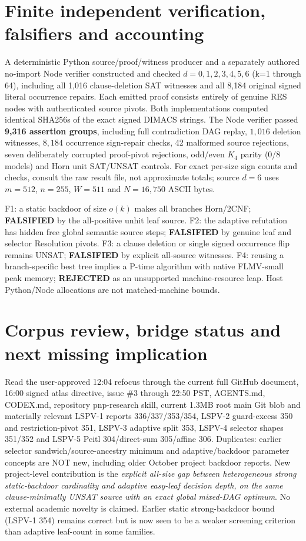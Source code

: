 \documentclass[11pt]{article}
\begin{document}
\section*{Finite independent verification, falsifiers and accounting}
A deterministic Python source/proof/witness producer and a separately authored no-import Node verifier constructed and checked \(d=0,1,2,3,4,5,6\) (k=1 through 64), including all 1,016 clause-deletion SAT witnesses and all 8,184 original signed literal occurrence repairs. Each emitted proof consists entirely of genuine RES nodes with authenticated source pivots. Both implementations computed identical SHA256s of the exact signed DIMACS strings. The Node verifier passed \textbf{9,316 assertion groups}, including full contradiction DAG replay, \(1,016\) deletion witnesses, \(8,184\) occurrence sign-repair checks, 42 malformed source rejections, seven deliberately corrupted proof-pivot rejections, odd/even \(K_4\) parity (0/8 models) and Horn unit SAT/UNSAT controls. For exact per-size sign counts and checks, consult the raw result file, not approximate totals; source \(d=6\) uses \(m=512\), \(n=255\), \(W=511\) and \(N=16,750\) ASCII bytes.

F1: a static backdoor of size \(o(k)\) makes all branches Horn/2CNF; \textbf{FALSIFIED} by the all-positive unhit leaf source. F2: the adaptive refutation has hidden free global semantic source steps; \textbf{FALSIFIED} by genuine leaf and selector Resolution pivots. F3: a clause deletion or single signed occurrence flip remains UNSAT; \textbf{FALSIFIED} by explicit all-source witnesses. F4: reusing a branch-specific best tree implies a P-time algorithm with native FLMV-small peak memory; \textbf{REJECTED} as an unsupported machine-resource leap. Host Python/Node allocations are not matched-machine bounds.

\section*{Corpus review, bridge status and next missing implication}
Read the user-approved 12:04 refocus through the current full GitHub document, 16:00 signed atlas directive, issue \#3 through 22:50 PST, AGENTS.md, CODEX.md, repository pnp-research skill, current 1.3MB root main Git blob and materially relevant LSPV-1 reports 336/337/353/354, LSPV-2 guard-excess 350 and restriction-pivot 351, LSPV-3 adaptive split 353, LSPV-4 selector shapes 351/352 and LSPV-5 Peitl 304/direct-sum 305/affine 306. Duplicates: earlier selector sandwich/source-ancestry minimum and adaptive/backdoor parameter concepts are NOT new, including older October project backdoor reports. New project-level contribution is the \emph{explicit all-size gap between heterogeneous strong static-backdoor cardinality and adaptive easy-leaf decision depth, on the same clause-minimally UNSAT source with an exact global mixed-DAG optimum}. No external academic novelty is claimed. Earlier static strong-backdoor bound (LSPV-1 354) remains correct but is now seen to be a weaker screening criterion than adaptive leaf-count in some families.
\end{document}
